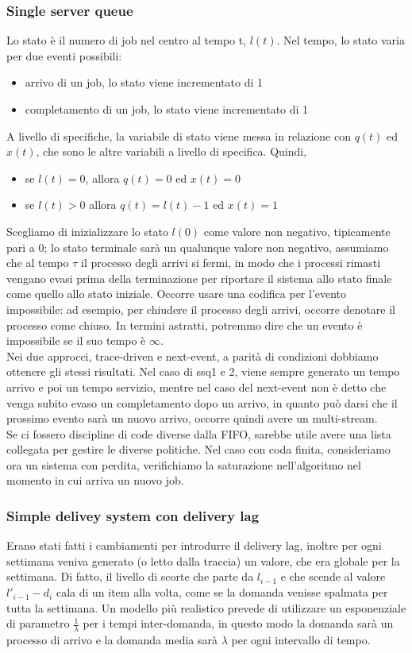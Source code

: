 \documentclass{article}
\begin{document}
\subsubsection{Single server queue}
Lo stato è il numero di job nel centro al tempo t, $l(t)$. Nel tempo, lo stato varia per due eventi possibili:
\begin{itemize}
\item arrivo di un job, lo stato viene incrementato di 1
\item completamento di un job, lo stato viene incrementato di 1
\end{itemize}
A livello di specifiche, la variabile di stato viene messa in relazione con $q(t)$ ed $x(t)$, che sono le altre variabili a livello di specifica. Quindi,
\begin{itemize}
\item se $l(t) = 0$, allora $q(t) = 0$ ed $x(t) = 0$
\item se $l(t) > 0$ allora $q(t) = l(t) - 1$ ed $x(t) = 1$
\end{itemize}
Scegliamo di inizializzare lo stato $l(0)$ come valore non negativo, tipicamente pari a 0; lo stato terminale sarà un qualunque valore non negativo, assumiamo che al tempo $\tau$ il processo degli arrivi si fermi, in modo che i processi rimasti vengano evasi prima della terminazione per riportare il sistema allo stato finale come quello allo stato iniziale. Occorre usare una codifica per l'evento impossibile: ad esempio, per chiudere il processo degli arrivi, occorre denotare il processo come chiuso. In termini astratti, potremmo dire che un evento è impossibile se il suo tempo è $\infty$.\\ Nei due approcci, trace-driven e next-event, a parità di condizioni dobbiamo ottenere gli stessi risultati. Nel caso di ssq1 e 2, viene sempre generato un tempo arrivo e poi un tempo servizio, mentre nel caso del next-event non è detto che venga subito evaso un completamento dopo un arrivo, in quanto può darsi che il prossimo evento sarà un nuovo arrivo, occorre quindi avere un multi-stream. \\ Se ci fossero discipline di code diverse dalla FIFO, sarebbe utile avere una lista collegata per gestire le diverse politiche. Nel caso con coda finita, consideriamo ora un sistema con perdita, verifichiamo la saturazione nell'algoritmo nel momento in cui arriva un nuovo job.
\subsubsection{Simple delivey system con delivery lag}
Erano stati fatti i cambiamenti per introdurre il delivery lag, inoltre per ogni settimana veniva generato (o letto dalla traccia) un valore, che era globale per la settimana. Di fatto, il livello di scorte che parte da $l_{i-1}$ e che scende al valore $l'_{i-1} - d_i$ cala di un item alla volta, come se la domanda venisse spalmata per tutta la settimana. Un modello più realistico prevede di utilizzare un esponenziale di parametro $\frac{1}{\lambda}$ per i tempi inter-domanda, in questo modo la domanda sarà un processo di arrivo e la domanda media sarà $\lambda$ per ogni intervallo di tempo.
\end{document}
